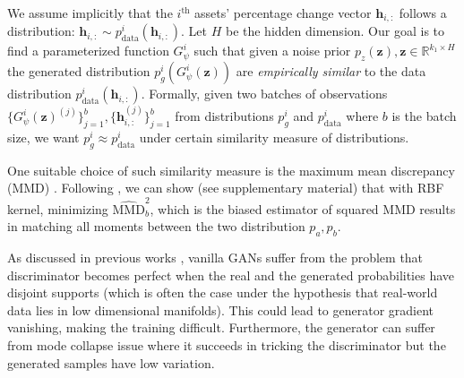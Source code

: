 \documentclass{article}
\begin{document}

We assume implicitly that the $i^{\text{th}}$ assets' percentage change vector $\mathbf{h}_{i,:}$ follows a distribution: $\mathbf{h}_{i,:}\sim p_{\text{data}}^i(\mathbf{h}_{i,:})$. Let $H$ be the hidden dimension. Our goal is to find a parameterized function $G^i_\psi$ such that given a noise prior $p_z(\mathbf{z}), \mathbf{z}\in\mathbb{R}^{k_1\times H}$ the generated distribution $p^i_g(G^i_\psi(\mathbf{z}))$ are \textit{empirically similar} to the data distribution $p_{\text{data}}^i(\mathbf{h}_{i,:})$. Formally, given two batches of observations  $\{G^i_\psi(\mathbf{z})^{(j)}\}^b_{j=1}, \{\mathbf{h}_{i,:}^{(j)}\}^b_{j=1}$ from distributions $p^i_g$ and $p_{\text{data}}^i$ where $b$ is the batch size, we want $p^i_g\approx p^i_{\text{data}}$ under certain similarity measure of distributions.

One suitable choice of such similarity measure is the maximum mean discrepancy (MMD) \cite{gretton2012}. Following \cite{yujia2015gmmn}, we can show (see supplementary material) that with RBF kernel, minimizing $\widehat{\text{MMD}}^2_b$, which is the biased estimator of squared MMD results in matching all moments between the two distribution $p_a, p_b$. 

As discussed in previous works \cite{arjovsky17a, arjovsky2017towards}, vanilla GANs suffer from the problem that discriminator becomes perfect when the real and the generated probabilities have disjoint supports (which is often the case under the hypothesis that real-world data lies in low dimensional manifolds). This could lead to generator gradient vanishing, making the training difficult. Furthermore, the generator can suffer from mode collapse issue where it succeeds in tricking the discriminator but the generated samples have low variation. 
\end{document}
